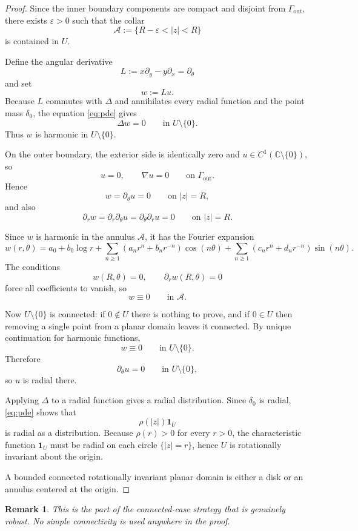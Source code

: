 \documentclass[11pt]{article}
\newtheorem{remark}[theorem]{Remark}
\newcommand{\C}{\mathbb C}
\newcommand{\1}{\mathbf 1}
\begin{document}
\begin{proof}
Since the inner boundary components are compact and disjoint from $\Gamma_{\mathrm{out}}$, there
exists $\varepsilon>0$ such that the collar
\[
\mathcal A:=\{R-\varepsilon<|z|<R\}
\]
is contained in $U$.

Define the angular derivative
\[
L:=x\partial_y-y\partial_x=\partial_\theta
\]
and set
\[
w:=Lu.
\]
Because $L$ commutes with $\Delta$ and annihilates every radial function and the point mass
$\delta_0$, the equation \eqref{eq:pde} gives
\[
\Delta w=0
\qquad\text{in }U\setminus\{0\}.
\]
Thus $w$ is harmonic in $U\setminus\{0\}$.

On the outer boundary, the exterior side is identically zero and $u\in C^1(\C\setminus\{0\})$,
so
\[
u=0,\qquad \nabla u=0
\qquad\text{on }\Gamma_{\mathrm{out}}.
\]
Hence
\[
w=\partial_\theta u=0
\qquad\text{on }|z|=R,
\]
and also
\[
\partial_r w=\partial_r\partial_\theta u=\partial_\theta\partial_r u=0
\qquad\text{on }|z|=R.
\]

Since $w$ is harmonic in the annulus $\mathcal A$, it has the Fourier expansion
\[
w(r,\theta)=a_0+b_0\log r+\sum_{n\ge 1}(a_n r^n+b_n r^{-n})\cos(n\theta)
+\sum_{n\ge 1}(c_n r^n+d_n r^{-n})\sin(n\theta).
\]
The conditions
\[
w(R,\theta)=0,\qquad \partial_r w(R,\theta)=0
\]
force all coefficients to vanish, so
\[
w\equiv 0
\qquad\text{in }\mathcal A.
\]

Now $U\setminus\{0\}$ is connected: if $0\notin U$ there is nothing to prove, and if $0\in U$
then removing a single point from a planar domain leaves it connected. By unique continuation for
harmonic functions,
\[
w\equiv 0
\qquad\text{in }U\setminus\{0\}.
\]
Therefore
\[
\partial_\theta u=0
\qquad\text{in }U\setminus\{0\},
\]
so $u$ is radial there.

Applying $\Delta$ to a radial function gives a radial distribution. Since $\delta_0$ is radial,
\eqref{eq:pde} shows that
\[
\rho(|z|)\1_U
\]
is radial as a distribution. Because $\rho(r)>0$ for every $r>0$, the characteristic function
$\1_U$ must be radial on each circle $\{|z|=r\}$, hence $U$ is rotationally invariant about the
origin.

A bounded connected rotationally invariant planar domain is either a disk or an annulus centered
at the origin.
\end{proof}

\begin{remark}
This is the part of the connected-case strategy that is genuinely robust. No simple connectivity
is used anywhere in the proof.
\end{remark}
\end{document}
